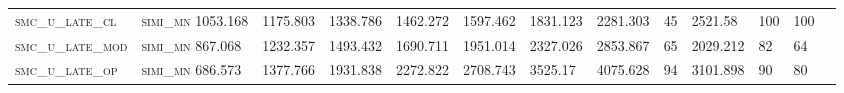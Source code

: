 \begin{landscape}
\begin{center}
\begin{footnotesize}
\begin{longtable}{lllllllllllll}
\textsc{smc\_u\_late\_cl  } & \textsc{simi\_mn  }   1053.168 & 1175.803 & 1338.786 & 1462.272 & 1597.462 & 1831.123 & 2281.303 & 45   & 2521.58  & 100 & 100  \\
\textsc{smc\_u\_late\_mod } & \textsc{simi\_mn  }   867.068  & 1232.357 & 1493.432 & 1690.711 & 1951.014 & 2327.026 & 2853.867 & 65   & 2029.212 & 82  & 64   \\
\textsc{smc\_u\_late\_op  } & \textsc{simi\_mn  }   686.573  & 1377.766 & 1931.838 & 2272.822 & 2708.743 & 3525.17  & 4075.628 & 94   & 3101.898 & 90  & 80   \\%


\end{longtable}
\end{footnotesize}
\end{center}
\end{landscape}

\restoregeometry
\pagestyle{headings}


